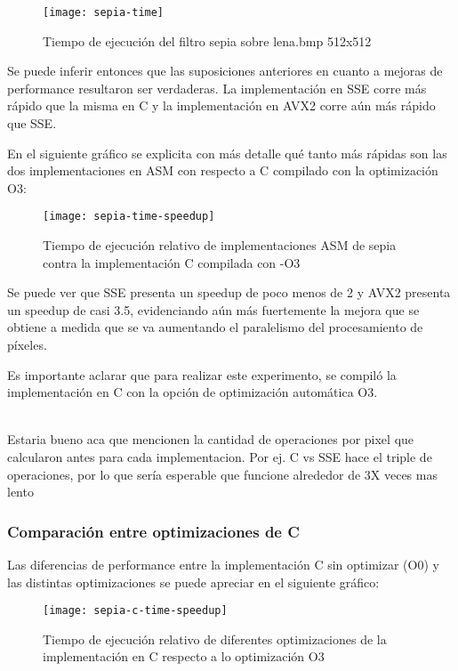\begin{figure}[h]
    \centering
    \texttt{[image: sepia-time]}
    \caption{Tiempo de ejecución del filtro sepia sobre lena.bmp 512x512}
    \label{fig:sepia-time}
\end{figure}

Se puede inferir entonces que las suposiciones anteriores en cuanto a mejoras de performance resultaron ser verdaderas. La implementación en SSE corre más rápido que la misma en C y la implementación en AVX2 corre aún más rápido que SSE.

En el siguiente gráfico se explicita con más detalle qué tanto más rápidas son las dos implementaciones en ASM con respecto a C compilado con la optimización O3:

\begin{figure}[h]
    \centering
    \texttt{[image: sepia-time-speedup]}
    \caption{Tiempo de ejecución relativo de implementaciones ASM de sepia contra la implementación C compilada con -O3}
    \label{fig:sepia-time-speedup}
\end{figure}

Se puede ver que SSE presenta un speedup de poco menos de 2 y AVX2 presenta un speedup de casi 3.5, evidenciando aún más fuertemente la mejora que se obtiene a medida que se va aumentando el paralelismo del procesamiento de píxeles.

Es importante aclarar que para realizar este experimento, se compiló la implementación en C con la opción de optimización automática O3.

\cuidado \\
Estaria bueno aca que mencionen la cantidad de operaciones por pixel que calcularon antes para cada implementacion. Por ej. C vs SSE hace el triple de operaciones, por lo que sería esperable que funcione alrededor de 3X veces mas lento
\cuidado

\subsubsection{Comparación entre optimizaciones de C}

Las diferencias de performance entre la implementación C sin optimizar (O0) y las distintas optimizaciones se puede apreciar en el siguiente gráfico:

\begin{figure}[h]
    \centering
    \texttt{[image: sepia-c-time-speedup]}
    \caption{Tiempo de ejecución relativo de diferentes optimizaciones de la implementación en C respecto a lo optimización O3}
    \label{fig:sepia-c-time}
\end{figure}

